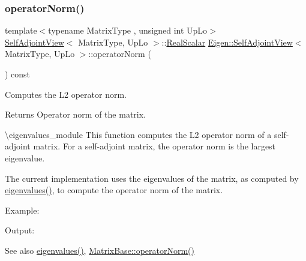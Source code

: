 \subsubsection{\texorpdfstring{operatorNorm()}{operatorNorm()}}
{\footnotesize\ttfamily template$<$typename Matrix\+Type , unsigned int Up\+Lo$>$ \\
\mbox{\hyperlink{class_eigen_1_1_self_adjoint_view}{Self\+Adjoint\+View}}$<$ Matrix\+Type, Up\+Lo $>$\+::\mbox{\hyperlink{class_eigen_1_1_self_adjoint_view_af9f0234ebeae4c4ca512bcd5fb5e8bb1}{Real\+Scalar}} \mbox{\hyperlink{class_eigen_1_1_self_adjoint_view}{Eigen\+::\+Self\+Adjoint\+View}}$<$ Matrix\+Type, Up\+Lo $>$\+::operator\+Norm (\begin{DoxyParamCaption}{ }\end{DoxyParamCaption}) const\hspace{0.3cm}{\ttfamily [inline]}}



Computes the L2 operator norm. 

\begin{DoxyReturn}{Returns}
Operator norm of the matrix.
\end{DoxyReturn}
\textbackslash{}eigenvalues\+\_\+module This function computes the L2 operator norm of a self-\/adjoint matrix. For a self-\/adjoint matrix, the operator norm is the largest eigenvalue.

The current implementation uses the eigenvalues of the matrix, as computed by \mbox{\hyperlink{class_eigen_1_1_self_adjoint_view_ad4f34424b4ea12de9bbc5623cb938b4f}{eigenvalues()}}, to compute the operator norm of the matrix.

Example\+: 
\begin{DoxyCodeInclude}{0}
\end{DoxyCodeInclude}
 Output\+: 
\begin{DoxyVerbInclude}
\end{DoxyVerbInclude}


\begin{DoxySeeAlso}{See also}
\mbox{\hyperlink{class_eigen_1_1_self_adjoint_view_ad4f34424b4ea12de9bbc5623cb938b4f}{eigenvalues()}}, \mbox{\hyperlink{class_eigen_1_1_matrix_base_a0ff9bc0b9bea2d0822a2bf3192783102}{Matrix\+Base\+::operator\+Norm()}} 
\end{DoxySeeAlso}
\mbox{\label{class_eigen_1_1_self_adjoint_view_a4739585861baa13b25dcce5ed6658311}} 
